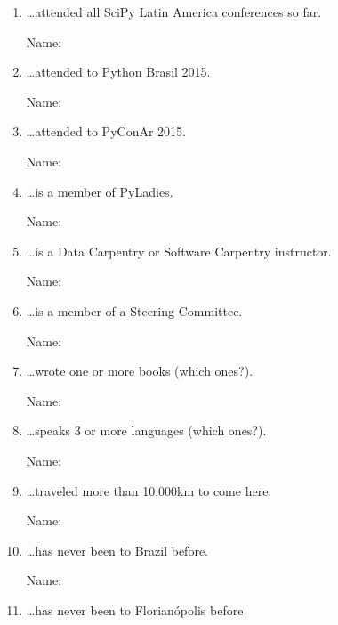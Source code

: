 \documentclass[12pt]{article}
\begin{document}
\clearpage

\restoregeometry

\newpage


\begin{enumerate}
  \setlength{\itemsep}{1.4em}
    \setlength{\parskip}{1.4em}

  \item \ldots attended all SciPy Latin America conferences so far.

    Name: \hrulefill

  \item \ldots attended to Python Brasil 2015.

    Name: \hrulefill

  \item \ldots attended to PyConAr 2015.

    Name: \hrulefill

  \item \ldots is a member of PyLadies.

    Name: \hrulefill

  \item \ldots is a Data Carpentry or Software Carpentry instructor.

    Name: \hrulefill

  \item \ldots is a member of a Steering Committee.

    Name: \hrulefill

  \newpage

  \item \ldots wrote one or more books (which ones?).

    Name: \hrulefill

  \item \ldots speaks 3 or more languages (which ones?).

    Name: \hrulefill

  \item \ldots traveled more than 10,000km to come here.

    Name: \hrulefill

  \item \ldots has never been to Brazil before.

    Name: \hrulefill

  \item \ldots has never been to Florianópolis before.


\end{enumerate}
\end{document}
